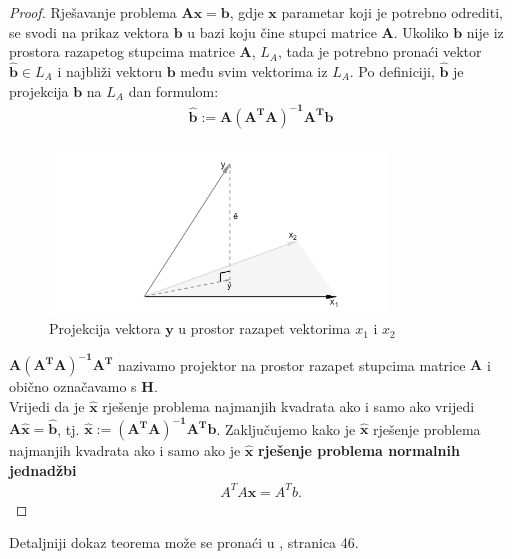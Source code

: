 \documentclass[a4paper,twoside,12pt]{memoir} %
\begin{document}
\begin{proof}
Rješavanje problema $\mathbf{A}\mathbf{x} = \mathbf{b}$, gdje $\mathbf{x}$ parametar koji je potrebno odrediti, se svodi na prikaz vektora $\mathbf{b}$ u bazi koju čine stupci matrice $\mathbf{A}$. Ukoliko $\mathbf{b}$ nije iz prostora razapetog stupcima matrice $\mathbf{A}$, $L_A$,
tada je potrebno pronaći vektor $\mathbf{\hat{b}} \in L_A$ i
najbliži vektoru $\mathbf{b}$ među svim vektorima iz $L_A$.
Po definiciji, $\mathbf{\hat{b}}$ je projekcija $\mathbf{b}$ na $L_A$ dan formulom:
\begin{align*}
\mathbf{\hat{b}} := \mathbf{A(A^TA)^{-1}A^T}\mathbf{b}
\end{align*}
\begin{figure}[H]
	\centering
	\includegraphics[width=0.8\textwidth]{linProjection}
	\caption{Projekcija vektora $\mathbf{y}$ u prostor razapet vektorima $x_1$ i $x_2$ \cite{svd_str15} }
	\label{Fig:projection}	
\end{figure}

$\mathbf{A(A^TA)^{-1}A^T}$ nazivamo projektor na prostor razapet stupcima matrice $\mathbf{A}$ i obično označavamo s $\mathbf{H}$.\\
Vrijedi da je $\mathbf{\hat{x}}$ rješenje problema najmanjih kvadrata ako i samo ako
vrijedi $\mathbf{A}\mathbf{\hat{x}} = \mathbf{\hat{b}}$, tj.
$\mathbf{\hat{x}}:= \mathbf{(A^TA)^{-1}A^T}\mathbf{b}$\label{eq:lin1Xeq}. Zaključujemo kako je $\mathbf{\hat{x}}$ rješenje problema najmanjih kvadrata ako i samo ako je $\mathbf{\hat{x}}$ \textbf{rješenje problema normalnih jednadžbi}
\begin{align}\label{eq:sustavProj}
A^TA\mathbf{x} = A^Tb.
\end{align}
\end{proof}

Detaljniji dokaz teorema može se pronaći u \cite{singer07}, stranica 46.\\
\end{document}
